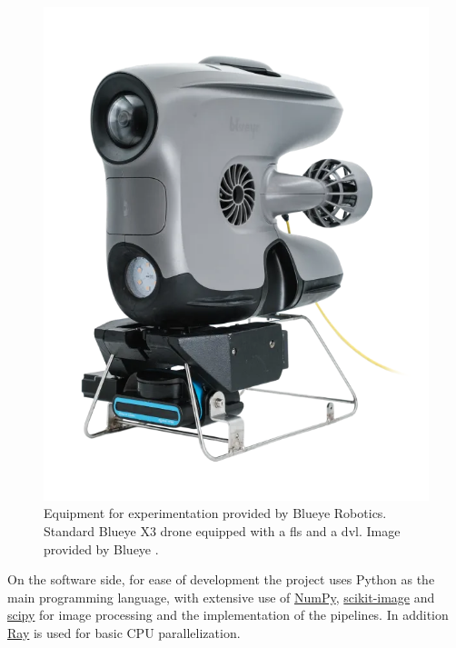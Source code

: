 \begin{figure}[H]
  \centering
  \includegraphics[width=.5\textwidth]{figures/blueye_x3.png}
  \caption[Blueye Robotics X3 \acrshort{rov} equipped with \acrshort{bsosonar}]{Equipment for experimentation provided by Blueye Robotics. Standard Blueye X3 drone equipped with a \acrshort{fls} and a \acrshort{dvl}. Image provided by Blueye \cite{Blueye:X3}.}
\end{figure}

On the software side, for ease of development the project uses Python as the main programming language, with extensive use of \href{https://numpy.org}{NumPy}, \href{https://scikit-image.org}{scikit-image} and \href{https://scipy.org}{scipy} for image processing and the implementation of the pipelines. In addition \href{https://www.ray.io}{Ray} is used for basic CPU parallelization. 

